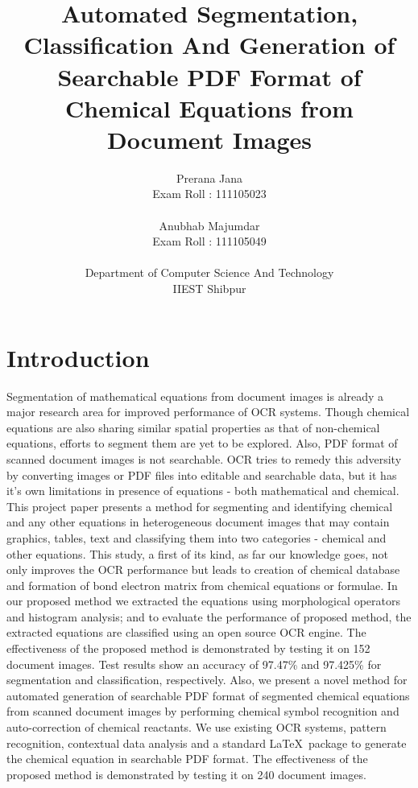 \documentclass[oneside,a4paper,12pt]{book}
\begin{document}
\title{\textbf{Automated Segmentation, Classification And Generation of Searchable PDF Format of Chemical Equations from Document Images}}
\author{Prerana Jana \\Exam Roll : 111105023\\ \\Anubhab Majumdar \\Exam Roll : 111105049\\ \\Department of Computer Science And Technology\\IIEST Shibpur}

\maketitle

\tableofcontents
		

\chapter{Introduction}
\label{sec:intro}
Segmentation of mathematical equations from document images  is  already a major research area for improved performance of  OCR systems. Though chemical equations  are also sharing similar spatial properties as that of non-chemical equations, efforts to segment them are yet to be explored. Also, PDF format of scanned document images is not searchable. OCR tries to remedy this adversity by converting images or PDF files into editable and searchable data, but it has it’s own limitations in presence of equations - both mathematical and chemical.
This project paper presents a method for segmenting and identifying chemical and any other equations in heterogeneous document images that
may contain graphics, tables, text 
and classifying them into two categories - chemical and other equations.
This study, a first of its kind, as far our knowledge goes,  not only improves the OCR performance but leads to creation of chemical database 
and formation of bond electron matrix from  chemical equations or formulae.
In our proposed method we extracted the equations using morphological operators 
and histogram analysis; and to evaluate the performance of proposed method, the extracted equations are classified using an open source OCR engine. The effectiveness of the proposed method 
is demonstrated by testing it on 152 document images.
Test results show an accuracy of 97.47\% and 97.425\% for  segmentation and classification, respectively.
Also, we present a novel method for automated generation of searchable PDF format of segmented chemical equations from scanned document images  by performing chemical symbol recognition and auto-correction of chemical reactants.  We use existing OCR systems, pattern recognition, contextual data analysis and a standard \LaTeX\  package to generate the chemical equation in searchable PDF format. The effectiveness of the proposed method is demonstrated by testing it on 240 document images.
\end{document}
